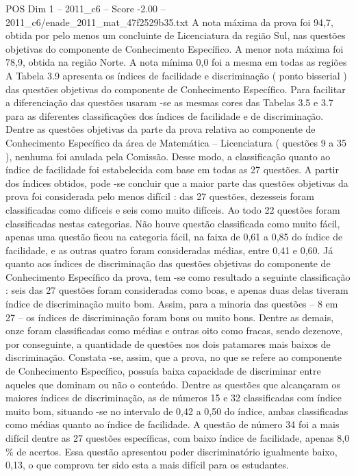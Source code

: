 \begin{textsample}{POS Dim 1 – 2011\_c6 – Score -2.00 – 2011\_c6/enade\_2011\_mat\_47f2529b35.txt}
A nota máxima da prova foi 94,7, obtida por pelo menos um concluinte de Licenciatura da região Sul, nas questões objetivas do componente de Conhecimento Específico.
A menor nota máxima foi 78,9, obtida na região Norte.
A nota mínima 0,0 foi a mesma em todas as regiões A Tabela 3.9 apresenta os índices de facilidade e discriminação ( ponto bisserial ) das questões objetivas do componente de Conhecimento Específico.
Para facilitar a diferenciação das questões usaram -se as mesmas cores das Tabelas 3.5 e 3.7 para as diferentes classificações dos índices de facilidade e de discriminação.
Dentre as questões objetivas da parte da prova relativa ao componente de Conhecimento Específico da área de Matemática – Licenciatura ( questões 9 a 35 ), nenhuma foi anulada pela Comissão.
Desse modo, a classificação quanto ao índice de facilidade foi estabelecida com base em todas as 27 questões.
A partir dos índices obtidos, pode -se concluir que a maior parte das questões objetivas da prova foi considerada pelo menos difícil : das 27 questões, dezesseis foram classificadas como difíceis e seis como muito difíceis.
Ao todo 22 questões foram classificadas nestas categorias.
Não houve questão classificada como muito fácil, apenas uma questão ficou na categoria fácil, na faixa de 0,61 a 0,85 do índice de facilidade, e as outras quatro foram consideradas médias, entre 0,41 e 0,60.
Já quanto aos índices de discriminação das questões objetivas do componente de Conhecimento Específico da prova, tem -se como resultado a seguinte classificação : seis das 27 questões foram consideradas como boas, e apenas duas delas tiveram índice de discriminação muito bom.
Assim, para a minoria das questões – 8 em 27 – os índices de discriminação foram bons ou muito bons.
Dentre as demais, onze foram classificadas como médias e outras oito como fracas, sendo dezenove, por conseguinte, a quantidade de questões nos dois patamares mais baixos de discriminação.
Constata -se, assim, que a prova, no que se refere ao componente de Conhecimento Específico, possuía baixa capacidade de discriminar entre aqueles que dominam ou não o conteúdo.
Dentre as questões que alcançaram os maiores índices de discriminação, as de números 15 e 32 classificadas com índice muito bom, situando -se no intervalo de 0,42 a 0,50 do índice, ambas classificadas como médias quanto ao índice de facilidade.
A questão de número 34 foi a mais difícil dentre as 27 questões específicas, com baixo índice de facilidade, apenas 8,0 \% de acertos.
Essa questão apresentou poder discriminatório igualmente baixo, 0,13, o que comprova ter sido esta a mais difícil para os estudantes.

\end{textsample}
